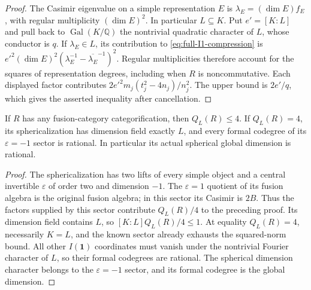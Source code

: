 \begin{proof}
The Casimir eigenvalue on a simple representation $E$ is
$\lambda_E=(\dim E)f_E$, with regular multiplicity $(\dim E)^2$.
In particular $L\subseteq K$.  Put $e'=[K:L]$ and pull back to
$\operatorname{Gal}(K/\mathbb Q)$ the nontrivial quadratic character of
$L$, whose conductor is $q$.  If $\lambda_E\in L$, its contribution to
\eqref{eq:full-I1-compression} is
$e'^2(\dim E)^2(\lambda_E^{-1}-\overline{\lambda_E}^{-1})^2$.
Regular multiplicities therefore account for the squares of representation
degrees, including when $R$ is noncommutative.  Each displayed factor
contributes $2e'^2m_j(t_j^2-4n_j)/n_j^2$.  The upper bound is $2e'/q$,
which gives the asserted inequality after cancellation.
\end{proof}

\begin{corollary}
If $R$ has any fusion-category categorification, then $Q_L(R)\leq4$.
If $Q_L(R)=4$, its sphericalization has dimension field exactly $L$,
and every formal codegree of its $\varepsilon=-1$ sector is rational.
In particular its actual spherical global dimension is rational.
\end{corollary}

\begin{proof}
The sphericalization has two lifts of every simple object and a central
invertible $\varepsilon$ of order two and dimension $-1$.
The $\varepsilon=1$ quotient of its fusion algebra is the original fusion
algebra; in this sector its Casimir is $2B$.  Thus the factors supplied by
this sector contribute $Q_L(R)/4$ to the preceding proof.  Its dimension
field contains $L$, so $[K:L]Q_L(R)/4\leq1$.
At equality $Q_L(R)=4$, necessarily $K=L$, and the known sector already
exhausts the squared-norm bound.  All other $I(\mathbf1)$ coordinates must
vanish under the nontrivial Fourier character of $L$, so their formal
codegrees are rational.  The spherical dimension character belongs to the
$\varepsilon=-1$ sector, and its formal codegree is the global dimension.
\end{proof}

